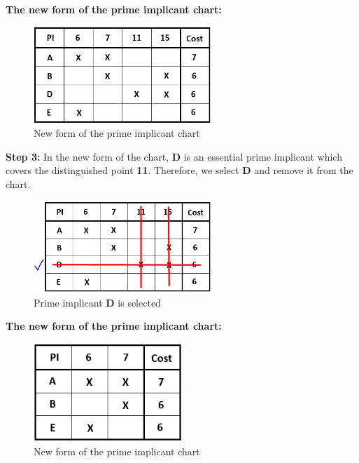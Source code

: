 \documentclass[pdftex,12pt,a4paper]{article}
\begin{document}
\begin{enumerate}[label=\alph*)]
   \textbf{The new form of the prime implicant chart:}
   \begin{figure}[H]
    \centering
        \includegraphics[width=0.6\textwidth]{chart5.png}	
        \caption{New form of the prime implicant chart}
        \label{fig1}
   \end{figure} 

   \textbf{Step 3:} In the new form of the chart, \textbf{D} is an essential prime implicant which covers the distinguished point \textbf{11}. Therefore, we select \textbf{D} and remove it from the chart.

   \begin{figure}[H]
    \centering
        \includegraphics[width=0.6\textwidth]{chart6.png}	
        \caption{Prime implicant \textbf{D} is selected}
        \label{fig1}
   \end{figure}

   \textbf{The new form of the prime implicant chart:}
   \begin{figure}[H]
    \centering
        \includegraphics[width=0.5\textwidth]{chart7.png}	
        \caption{New form of the prime implicant chart}
        \label{fig1}
   \end{figure}


\end{enumerate}
\end{document}
